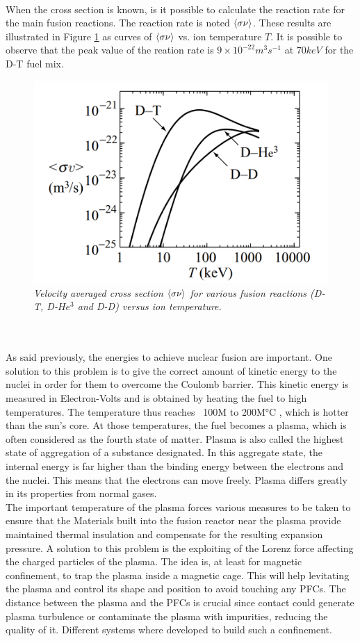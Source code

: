 \\
\normalsize{\indent When the cross section is known, is it possible to calculate the reaction rate for the main fusion reactions. The reaction rate is noted $\left\langle \sigma \nu \right\rangle$. These results are illustrated in Figure \ref{fig:fig_2_3} as curves of $\left\langle \sigma \nu \right\rangle$ vs. ion temperature $T$. It is possible to observe that the peak value of the reation rate is $9 \times 10^{-22} m^{3}s^{-1}$ at $70keV$ for the D-T fuel mix.}
\\
\begin{figure}[h!]
    \centering
    \includegraphics[width=.67\textwidth]{figures/reactionrate.png}
    \caption{\it Velocity averaged cross section $\left\langle \sigma \nu \right\rangle$ for various fusion reactions (D-T, D-$He^3$ and D-D) versus ion temperature. \cite{Freidberg_2007}}
    \label{fig:fig_2_3}
\end{figure}
\\
\normalsize{\indent }
\\
\normalsize{\indent As said previously, the energies to achieve nuclear fusion are important. One solution to this problem is to give the correct amount of kinetic energy to the nuclei in order for them to overcome the Coulomb barrier. This kinetic energy is measured in Electron-Volts and is obtained by heating the fuel to high temperatures. The temperature thus reaches ~100M to 200M°C \cite{diekmann_energie:_2014}, which is hotter than the sun’s core. At those temperatures, the fuel becomes a plasma, which is often considered as the fourth state of matter. Plasma is also called the highest state of aggregation of a substance designated. In this aggregate state, the internal energy is far higher than the binding energy between the electrons and the nuclei. This means that the electrons can move freely. Plasma differs greatly in its properties from normal gases.}
\\
\break
\normalsize{\indent The important temperature of the plasma forces various measures to be taken to ensure that the Materials built into the fusion reactor near the plasma provide maintained thermal insulation and compensate for the resulting expansion pressure. A solution to this problem is the exploiting of the Lorenz force affecting the charged particles of the plasma. The idea is, at least for magnetic confinement, to trap the plasma inside a magnetic cage. This will help levitating the plasma and control its shape and position to avoid touching any \acrshort{PFCs}. The distance between the plasma and the \acrshort{PFCs} is crucial since contact could generate plasma turbulence or contaminate the plasma with impurities, reducing the quality of it. Different systems where developed to build such a confinement. }
